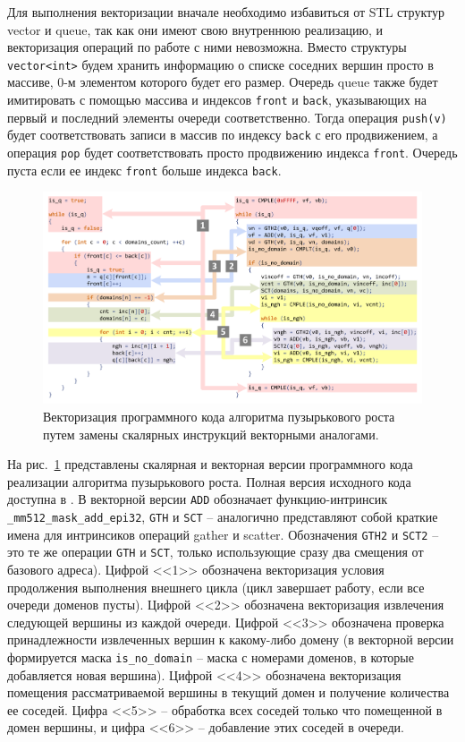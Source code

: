 Для выполнения векторизации вначале необходимо избавиться от STL\label{abbr:stl-1} структур vector и queue, так как они имеют свою внутреннюю реализацию, и векторизация операций по работе с ними невозможна.
Вместо структуры \texttt{vector<int>} будем хранить информацию о списке соседних вершин просто в массиве, 0-м элементом которого будет его размер.
Очередь queue также будет имитировать с помощью массива и индексов \texttt{front} и \texttt{back}, указывающих на первый и последний элементы очереди соответственно.
Тогда операция \texttt{push(v)} будет соответствовать записи в массив по индексу \texttt{back} с его продвижением, а операция \texttt{pop} будет соответствовать просто продвижению индекса \texttt{front}.
Очередь пуста если ее индекс \texttt{front} больше индекса \texttt{back}.

\begin{figure}[ht]
\centering
\includegraphics[width=1.0\textwidth]{fig/vec_genetic_code.pdf}
\singlespacing
{}\caption{Векторизация программного кода алгоритма пузырькового роста путем замены скалярных инструкций векторными аналогами.}
\label{fig:text_4_vec_integer_code}
\end{figure}

На рис.~\ref{fig:text_4_vec_integer_code} представлены скалярная и векторная версии программного кода реализации алгоритма пузырькового роста.
Полная версия исходного кода доступна в \cite{comboptGithub}.
В векторной версии \texttt{ADD} обозначает функцию-интринсик \texttt{\_mm512\_mask\_add\_epi32}, \texttt{GTH} и \texttt{SCT} -- аналогично представляют собой краткие имена для интринсиков операций gather и scatter.
Обозначения \texttt{GTH2} и \texttt{SCT2} -- это те же операции \texttt{GTH} и \texttt{SCT}, только использующие сразу два смещения от базового адреса).
Цифрой <<1>> обозначена векторизация условия продолжения выполнения внешнего цикла (цикл завершает работу, если все очереди доменов пусты).
Цифрой <<2>> обозначена векторизация извлечения следующей вершины из каждой очереди.
Цифрой <<3>> обозначена проверка принадлежности извлеченных вершин к какому-либо домену (в векторной версии формируется маска \texttt{is\_no\_domain} -- маска с номерами доменов, в которые добавляется новая вершина).
Цифрой <<4>> обозначена векторизация помещения рассматриваемой вершины в текущий домен и получение количества ее соседей. 
Цифра <<5>> -- обработка всех соседей только что помещенной в домен вершины, и цифра <<6>> -- добавление этих соседей в очереди.

